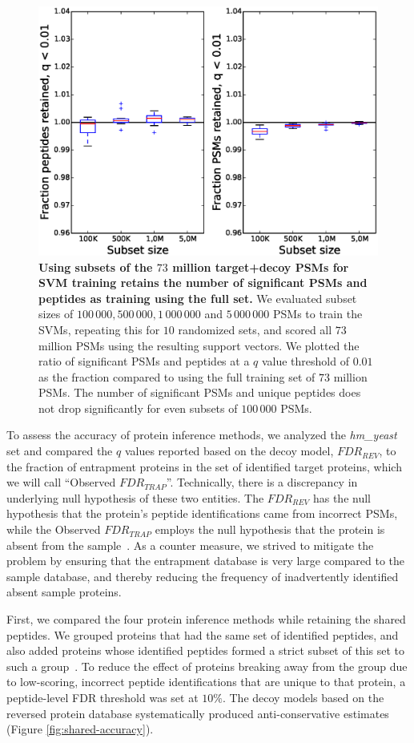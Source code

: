 \documentclass{article}
\begin{document}
\begin{figure}[!htp]
\begin{center}
\includegraphics[width=0.6\linewidth]{./img/subset-performance}
\caption{\label{fig:subset}\textbf{Using subsets of the $73$ million
target+decoy PSMs for SVM training retains the number of significant
PSMs and peptides as training using the full set.} We evaluated subset
sizes of $100\,000, 500\,000, 1\,000\,000$ and $5\,000\,000$ PSMs to
train the SVMs, repeating this for $10$ randomized sets, and scored
all $73$ million PSMs using the resulting support vectors. We plotted
the ratio of significant PSMs and peptides at a $q$ value threshold of
$0.01$ as the fraction compared to using the full training set of $73$
million PSMs. The number of significant PSMs and unique peptides does
not drop significantly for even subsets of $100\,000$ PSMs.}
\end{center}
\end{figure}

To assess the accuracy of protein inference methods, we analyzed the
{\em hm\_yeast} set and compared the $q$ values reported based on the
decoy model, $FDR_{REV}$, to the fraction of entrapment proteins in
the set of identified target proteins, which we will call ``Observed
$FDR_{TRAP}$''. Technically, there is a discrepancy in underlying null
hypothesis of these two entities. The $FDR_{REV}$ has the null
hypothesis that the protein's peptide identifications came from
incorrect PSMs, while the Observed $FDR_{TRAP}$ employs the null
hypothesis that the protein is absent from the sample~\cite{the:how}.
As a counter measure, we strived to mitigate the problem by ensuring
that the entrapment database is very large compared to the sample
database, and thereby reducing the frequency of inadvertently
identified absent sample proteins.

First, we compared the four protein inference methods while retaining
the shared peptides. We grouped proteins that had the same set of
identified peptides, and also added proteins whose identified peptides
formed a strict subset of this set to such a
group~\cite{serang2012review}. To reduce the effect of proteins
breaking away from the group due to low-scoring, incorrect peptide
identifications that are unique to that protein, a peptide-level FDR
threshold was set at $10\%$. The decoy models based on the reversed
protein database systematically produced anti-conservative estimates
(Figure \ref{fig:shared-accuracy}).
\end{document}
